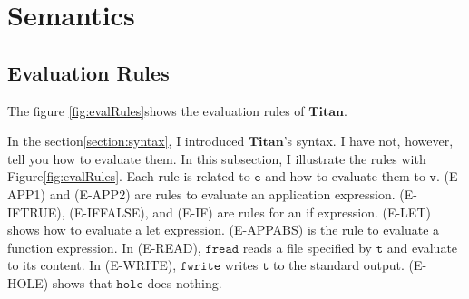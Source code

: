 \documentclass[12pt, a4paper, titlepage]{report}
\begin{document}
  \section{Semantics}
    \subsection{Evaluation Rules}
      The figure \ref{fig:evalRules}shows the evaluation rules of $\mathbf{Titan}$.

      In the section\ref{section:syntax}, I introduced $\mathbf{Titan}$'s syntax.
      I have not, however, tell you how to evaluate them.
      In this subsection, I illustrate the rules with Figure\ref{fig:evalRules}.
      Each rule is related to $\mathtt{e}$ and how to evaluate them to $\mathtt{v}$.
      (\textrm{E-APP1}) and (\textrm{E-APP2}) are rules to evaluate an application expression.
      (\textrm{E-IFTRUE}), (\textrm{E-IFFALSE}), and (\textrm{E-IF}) are rules for an if expression.
      (\textrm{E-LET}) shows how to evaluate a let expression.
      (\textrm{E-APPABS}) is the rule to evaluate a function expression.
      In (\textrm{E-READ}), $\mathtt{fread}$ reads a file specified by $\mathtt{t}$ and evaluate to its content.
      In (\textrm{E-WRITE}), $\mathtt{fwrite}$ writes $\mathtt{t}$ to the standard output.
      (\textrm{E-HOLE}) shows that $\mathtt{hole}$ does nothing.
\end{document}
